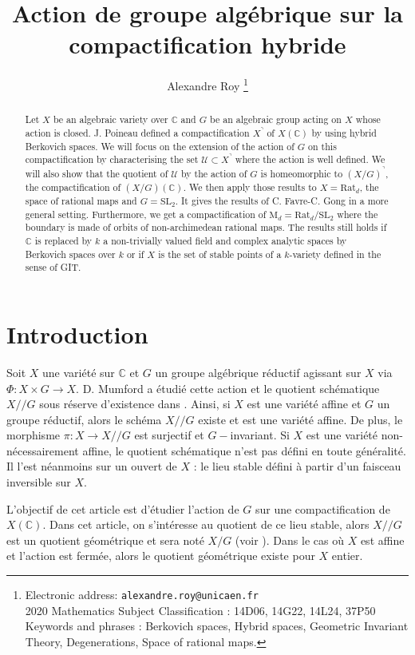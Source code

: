 \documentclass[11pt]{article}
\title{Action de groupe algébrique sur la compactification hybride}
\author{Alexandre Roy
  \thanks{Electronic address: \texttt{alexandre.roy@unicaen.fr}\\ 2020 Mathematics Subject Classification : 14D06, 14G22, 14L24, 37P50\\ Keywords and phrases : Berkovich spaces, Hybrid spaces, Geometric Invariant Theory, Degenerations, Space of rational maps.}}
\affil{Université Caen Normandie, CNRS, Normandie Univ, LMNO UMR6139, F-14000 CAEN, FRANCE }
\newcommand{\C}{\mathbb{C}}
\begin{document}
\maketitle 
\begin{abstract}
Let $X$ be an algebraic variety over $\mathbb{C}$ and $G$ be an algebraic group acting on $X$ whose action is closed. J. Poineau defined a compactification $X^\urcorner$ of $X(\mathbb{C})$ by using hybrid Berkovich spaces. We will focus on the extension of the action of $G$ on this compactification by characterising the set $\mathcal{U} \subset X^\urcorner$ where the action is well defined. We will also show that the quotient of $\mathcal{U}$ by the action of $G$ is homeomorphic to $(X/G)^\urcorner$, the compactification of $(X/G)(\mathbb{C})$. We then apply those results to $X = \mathrm{Rat}_d$, the space of rational maps and $G = \mathrm{SL}_2$. It gives the results of C. Favre-C. Gong in a more general setting. Furthermore, we get a compactification of $\mathrm{M}_d = \mathrm{Rat}_d/\mathrm{SL}_2$ where the boundary is made of orbits of non-archimedean rational maps. The results still holds if $\mathbb{C}$ is replaced by $k$ a non-trivially valued field and complex analytic spaces by Berkovich spaces over $k$ or if $X$ is the set of stable points of a $k$-variety defined in the sense of GIT.
\end{abstract}

\tableofcontents

\section{Introduction}
Soit $X$ une variété sur $\C$ et $G$ un groupe algébrique réductif agissant sur $X$ via $\Phi : X \times G \rightarrow X$. D. Mumford a étudié cette action et le quotient schématique $X/\! /G$ sous réserve d'existence dans \cite{GIT}. Ainsi, si $X$ est une variété affine et $G$ un groupe réductif, alors le schéma $X/\! /G$ existe et est une variété affine. De plus, le morphisme $\pi : X \rightarrow X/\! /G$ est surjectif et $G-$invariant. Si $X$ est une variété non-nécessairement affine, le quotient schématique n'est pas défini en toute généralité. Il l'est néanmoins sur un ouvert de $X$ : le lieu stable défini à partir d'un faisceau inversible sur $X$.

L'objectif de cet article est d'étudier l'action de $G$ sur une compactification de $X(\C)$. Dans cet article, on s'intéresse au quotient de ce lieu stable, alors $X/\! /G$ est un quotient géométrique et sera noté $X/G$ (voir \cite{GIT}). Dans le cas où $X$ est affine et l'action est fermée, alors le quotient géométrique existe pour $X$ entier.  
\end{document}
